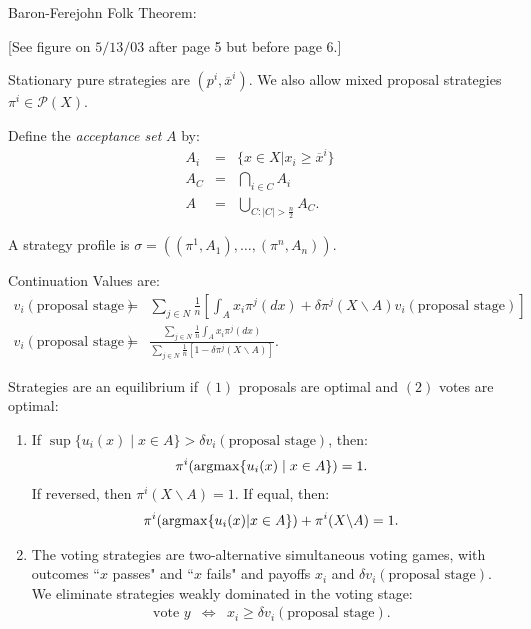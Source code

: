 \documentclass[12pt]{article}
\newcommand{\argmax}{\operatornamewithlimits{argmax}}
\newcommand{\n}{\noindent}
\newcommand{\s}{\vspace{5mm}}
\begin{document}
\s
\n Baron-Ferejohn Folk Theorem: 
\begin{center}
[See figure on $5/13/03$ after page 5 but before page 6.]
\end{center}

\s
\n  Stationary pure strategies are $(p^i,\overline{x}^i)$.  We also allow mixed proposal strategies $\pi^i\in\mathcal{P}(X)$.

\s
\n  Define the \textit{acceptance set} $A$ by:
\begin{eqnarray*}
A_i&=&\{x\in X|x_i\geq\overline{x}^i\}\\
A_C&=&\bigcap_{i\in C}A_i\\
A&=&\bigcup_{C:|C|>\frac{n}{2}}A_C.
\end{eqnarray*}

\s
\n  A strategy profile is $\sigma=((\pi^1,A_1),\hdots,(\pi^n,A_n))$.

\s
\n Continuation Values are:
\begin{eqnarray*}
v_i(\mbox{proposal stage})&=&\sum_{j\in N}\frac{1}{n}\left[\int_Ax_i\pi^j(dx)+\delta\pi^j(X\backslash A)v_i(\mbox{proposal stage})\right]\\
v_i(\mbox{proposal stage})&=&\frac{\sum_{j\in N}\frac{1}{n}\int_Ax_i\pi^j(dx)}{\sum_{j\in N}\frac{1}{n}\left[1-\delta\pi^j(X\backslash A)\right]}.
\end{eqnarray*}

\s
\n Strategies are an equilibrium if $(1)$ proposals are optimal and $(2)$ votes are optimal:
\begin{enumerate}
\item If $\sup{\{u_i(x)\mid x\in A\}}>\delta v_i(\mbox{proposal stage})$, then:
\begin{eqnarray*}
\pi^i(\argmax\{u_i(x)\mid x\in A\})=1.
\end{eqnarray*}  If reversed, then $\pi^i(X\backslash A)=1$.  If equal, then:
\begin{eqnarray*}
\pi^i(\argmax\{u_i(x)|x\in A\})+\pi^i(X\backslash A)=1.
\end{eqnarray*}
\item The voting strategies are two-alternative simultaneous voting games, with outcomes ``$x$ passes" and ``$x$ fails" and payoffs $x_i$ and $\delta v_i(\mbox{proposal stage})$.  We eliminate strategies weakly dominated in the voting stage:
\begin{eqnarray*}
\mbox{vote }y&\Longleftrightarrow&x_i\geq\delta v_i(\mbox{proposal stage}).
\end{eqnarray*}
\end{enumerate}
\end{document}
